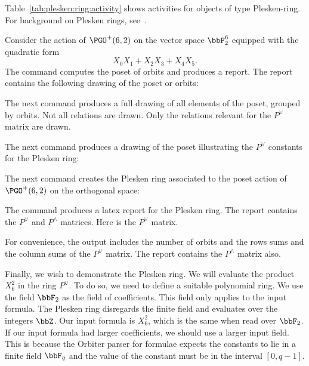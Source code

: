 Table~\ref{tab:plesken:ring:activity} shows activities for objects of type Plesken-ring. 
For background on Plesken rings, see~\cite{Plesken82}. 





\bigskip

Consider the action of $\PGO^+(6,2)$ on the vector space $\bbF_2^6$ equipped with the quadratic form 
$$
X_0X_1+X_2X_3+X_4X_5.
$$
The command computes the poset of orbits and produces a report.
The report contains the following drawing of the poset or orbits:



The next command produces a full drawing of all elements of the poset, grouped by orbits. 
Not all relations are drawn. 
Only the relations relevant for the $P^\vee$ matrix are drawn.






The next command produces a drawing of the poset 
illustrating the $P^\vee$ constants for the Plesken ring:






The next command creates the Plesken ring associated 
to the poset action of $\PGO^+(6,2)$ on the orthogonal space:



The command produces a latex report for the Plesken ring. 
The report contains the $P^\vee$ and $P^\wedge$ matrices.
Here is the $P^\vee$ matrix. 



For convenience, the output includes the number of orbits and the rows sums and the column sums of 
the $P^\vee$ matrix. The report contains the $P^\wedge$ matrix also. 

\bigskip


Finally, we wish to demonstrate the Plesken ring. 
We will evaluate the product $X_6^2$ in the ring $P^\vee$.
To do so, we need to define a suitable polynomial ring. 
We use the field $\bbF_2$ as the field of coefficients. 
This field only applies to the input formula. 
The Plesken ring disregards 
the finite field and evaluates over the integers $\bbZ$.
Our input formula is $X_6^2$, which is the same when read over $\bbF_2$. 
If our input formula had larger coefficients, we 
should use a larger input field. 
This is because the Orbiter parser for formulae 
expects the constants to lie in a finite field $\bbF_q$
and the value of the constant must be in the interval $[0,q-1]$. 


